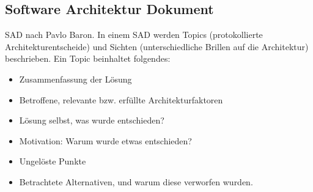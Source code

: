 \subsection{Software Architektur Dokument}
SAD nach Pavlo Baron. In einem SAD werden Topics (protokollierte Architekturentscheide) und Sichten (unterschiedliche Brillen auf die Architektur) beschrieben. 
Ein Topic beinhaltet folgendes:

\begin{itemize}
	\item Zusammenfassung der Lösung
	\item Betroffene, relevante bzw. erfüllte Architekturfaktoren
	\item Lösung selbst, was wurde entschieden?
	\item Motivation: Warum wurde etwas entschieden?
	\item Ungelöste Punkte
	\item Betrachtete Alternativen, und warum diese verworfen wurden.
\end{itemize}
